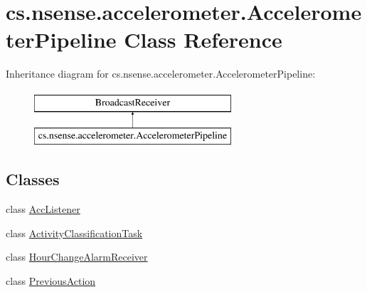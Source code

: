 \hypertarget{classcs_1_1nsense_1_1accelerometer_1_1_accelerometer_pipeline}{\section{cs.\-nsense.\-accelerometer.\-Accelerometer\-Pipeline Class Reference}
\label{classcs_1_1nsense_1_1accelerometer_1_1_accelerometer_pipeline}
}
Inheritance diagram for cs.\-nsense.\-accelerometer.\-Accelerometer\-Pipeline\-:\begin{figure}[H]
\begin{center}
\leavevmode
\includegraphics[height=2.000000cm]{classcs_1_1nsense_1_1accelerometer_1_1_accelerometer_pipeline}
\end{center}
\end{figure}
\subsection*{Classes}
\begin{DoxyCompactItemize}
\item 
class \hyperlink{classcs_1_1nsense_1_1accelerometer_1_1_accelerometer_pipeline_1_1_acc_listener}{Acc\-Listener}
\item 
class \hyperlink{classcs_1_1nsense_1_1accelerometer_1_1_accelerometer_pipeline_1_1_activity_classification_task}{Activity\-Classification\-Task}
\item 
class \hyperlink{classcs_1_1nsense_1_1accelerometer_1_1_accelerometer_pipeline_1_1_hour_change_alarm_receiver}{Hour\-Change\-Alarm\-Receiver}
\item 
class \hyperlink{classcs_1_1nsense_1_1accelerometer_1_1_accelerometer_pipeline_1_1_previous_action}{Previous\-Action}
\end{DoxyCompactItemize}
